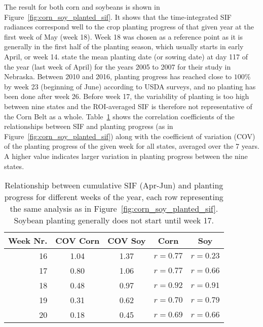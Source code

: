 \documentclass[preprint, a4paper, 10pt, times, 5p]{elsarticle}
\begin{document}
The result for both corn and soybeans is shown in Figure~\ref{fig:corn_soy_planted_sif}. It shows that the time-integrated SIF radiances correspond well to the crop planting progress of that given year at the first week of May (week 18). Week 18 was chosen as a reference point as it is generally in the first half of the planting season, which usually starts in early April, or week 14. \citet{grassini2011high} state the mean planting date (or sowing date) at day 117 of the year (last week of April) for the years 2005 to 2007 for their study in Nebraska. Between 2010 and 2016, planting progress has reached close to $100\%$ by week 23 (beginning of June) according to USDA surveys, and no planting has been done after week 26. Before week 17, the variability of planting is too high between nine states and the ROI-averaged SIF is therefore not representative of the Corn Belt as a whole. Table~\ref{tbl:planting_progress_table} shows the correlation coefficients of the relationships between SIF and planting progress (as in Figure~\ref{fig:corn_soy_planted_sif}) along with the coefficient of variation (COV) of the planting progress of the given week for all states, averaged over the 7 years. A higher value indicates larger variation in planting progress between the nine states.

\begin{table}[htp]
\begin{center}
\begin{tabular}{r|c|c|c|c}
Week Nr. & COV Corn & COV Soy & Corn & Soy \\
\hline
16 & 1.04 & 1.37 & $r = 0.77$ & $r = 0.23$ \\
17 & 0.80 & 1.06 & $r = 0.77$ & $r = 0.66$ \\
18 & 0.48 & 0.97 & $r = 0.92$ & $r = 0.91$ \\
19 & 0.31 & 0.62 & $r = 0.70$ & $r = 0.79$ \\
20 & 0.18 & 0.45 & $r = 0.69$ & $r = 0.66$ \\
\end{tabular}
\end{center}
\label{tbl:planting_progress_table}
\caption{Relationship between cumulative SIF (Apr-Jun) and planting progress for different weeks of the year, each row representing the same analysis as in Figure~\ref{fig:corn_soy_planted_sif}. Soybean planting generally does not start until week 17.}
\end{table}%
\end{document}
